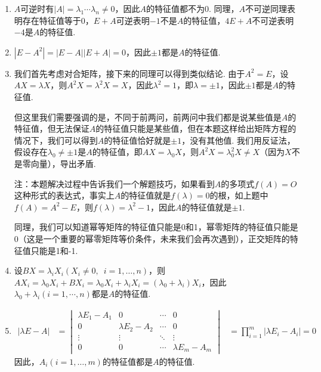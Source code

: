\begin{solution}
    \begin{enumerate}
        \item $A$可逆时有$|A|=\lambda_1\cdots\lambda_n\neq 0$，因此$A$的特征值都不为0. 同理，$A$不可逆同理表明存在特征值等于0，$E+A$可逆表明$-1$不是$A$的特征值，$4E+A$不可逆表明$-4$是$A$的特征值.

        \item $|E-A^2|=|E-A||E+A|=0$，因此$\pm 1$都是$A$的特征值.

        \item 我们首先考虑对合矩阵，接下来的同理可以得到类似结论. 由于$A^2=E$，设$AX=\lambda X$，则$A^2X=\lambda^2X=X$，因此$\lambda^2=1$，即$\lambda=\pm 1$，因此$\pm 1$都是$A$的特征值.

              但这里我们需要强调的是，不同于前两问，前两问中我们都是说某些值是$A$的特征值，但无法保证$A$的特征值只能是某些值，但在本题这样给出矩阵方程的情况下，我们可以得到$A$的特征值恰好就是$\pm 1$，没有其他值. 我们用反证法，假设存在$\lambda_0\neq\pm 1$是$A$的特征值，即$AX=\lambda_0X$，则$A^2X=\lambda_0^2X\neq X$（因为$X$不是零向量），导出矛盾.

              注：本题解决过程中告诉我们一个解题技巧，如果看到$A$的多项式$f(A)=O$这种形式的表达式，事实上$A$的特征值就是$f(\lambda)=0$的根，如上题中$f(A)=A^2-E$，则$f(\lambda)=\lambda^2-1$，因此$A$的特征值就是$\pm 1$.

              同理，我们可以知道幂等矩阵的特征值只能是0和1，幂零矩阵的特征值只能是0（这是一个重要的幂零矩阵等价条件，未来我们会再次遇到），正交矩阵的特征值只能是1和-1.

        \item 设$BX=\lambda_iX_i(X_i\neq 0,\enspace i=1,\ldots,n)$，则$AX_i=\lambda_0X_i+BX_i=\lambda_0X_i+\lambda_iX_i=(\lambda_0+\lambda_i)X_i$，因此$\lambda_0+\lambda_i(i=1,\cdots,n)$都是$A$的特征值.

        \item \begin{align*}
                  |\lambda E-A| & =\begin{vmatrix}
                                       \lambda E_1-A_1 & 0               & \cdots & 0               \\
                                       0               & \lambda E_2-A_2 & \cdots & 0               \\
                                       \vdots          & \vdots          & \ddots & \vdots          \\
                                       0               & 0               & \cdots & \lambda E_m-A_m
                                   \end{vmatrix}
                                & =\prod_{i=1}^{m}|\lambda E_i-A_i|=0
              \end{align*}
              因此，$A_i(i=1,\ldots,m)$的特征值都是$A$的特征值.
    \end{enumerate}
\end{solution}


